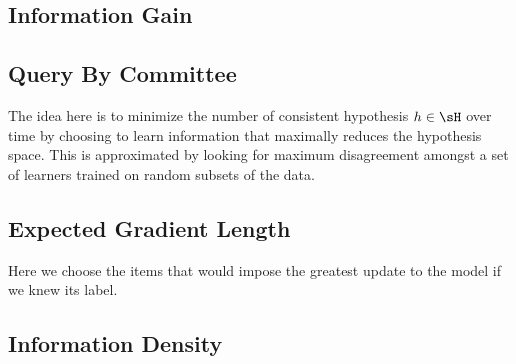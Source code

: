 \subsection{Information Gain}

\subsection{Query By Committee}

The idea here is to minimize the number of consistent hypothesis $h \in \sH$ over time by choosing to learn information that maximally reduces the hypothesis space.
 This is approximated by looking for maximum disagreement amongst a set of learners trained on random subsets of the data.

\subsection{Expected Gradient Length}

Here we choose the items that would impose the greatest update to the model if we knew its label.

\subsection{Information Density}



